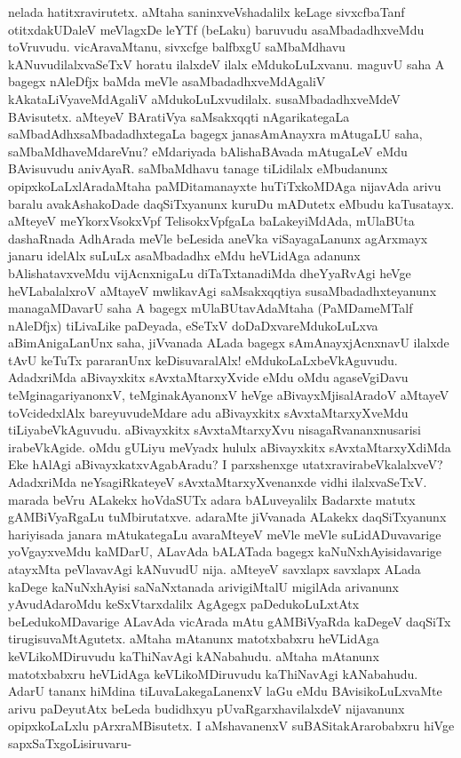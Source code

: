 nelada hatitxravirutetx. aMtaha saninxveVshadalilx keLage sivxcfbaTanf otitxdakUDaleV meVlagxDe leYTf (beLaku) baruvudu asaMbadadhxveMdu toVruvudu. vicAravaMtanu, \hbox{sivxcfge} balfbxgU saMbaMdhavu kANuvudilalxvaSeTxV horatu ilalxdeV ilalx eMdukoLuLxvanu. maguvU saha A bagegx nAleDfjx baMda meVle asaMbadadhxveMdAgaliV kAkataLiVyaveMdAgaliV aMdukoLuLxvudilalx. susaMbadadhxveMdeV BAvisutetx. aMteyeV BAratiVya saMsakxqqti nAgarikategaLa saMbadAdhxsaMbadadhxtegaLa bagegx janasAmAnayxra mAtugaLU saha, saMbaMdhaveMdareVnu? eMdariyada bAlishaBAvada mAtugaLeV eMdu BAvisuvudu anivAyaR. saMbaMdhavu tanage tiLidilalx eMbudanunx opipxkoLaLxlAradaMtaha paMDitamanayxte huTiTxkoMDAga nijavAda arivu baralu avakAshakoDade daqSiTxyanunx kuruDu mADutetx  eMbudu kaTusatayx. aMteyeV meYkorxVsokxVpf TelisokxVpfgaLa baLakeyiMdAda, mUlaBUta dashaRnada AdhArada meVle beLesida aneVka viSayagaLanunx agArxmayx janaru idelAlx suLuLx asaMbadadhx eMdu heVLidAga adanunx bAlishatavxveMdu vijAcnxnigaLu diTaTxtanadiMda dheYyaRvAgi heVge heVLabalalxroV aMtayeV mwlikavAgi saMsakxqqtiya susaMbadadhxteyanunx managaMDavarU saha A bagegx mUlaBUtavAdaMtaha (PaMDameMTalf nAleDfjx) tiLivaLike paDeyada, eSeTxV doDaDxvareMdukoLuLxva aBimAnigaLanUnx saha, jiVvanada ALada bagegx sAmAnayxjAcnxnavU ilalxde tAvU keTuTx pararanUnx keDisuvaralAlx! eMdukoLaLxbeVkAguvudu. AdadxriMda aBivayxkitx sAvxtaMtarxyXvide eMdu oMdu agaseVgiDavu teMginagariyanonxV, teMginakAyanonxV heVge aBivayxMjisalAradoV aMtayeV toVcidedxlAlx bareyuvudeMdare adu aBivayxkitx sAvxtaMtarxyXveMdu tiLiyabeVkAguvudu. aBivayxkitx sAvxtaMtarxyXvu nisagaRvananxnusarisi irabeVkAgide. oMdu gULiyu meVyadx hululx aBivayxkitx sAvxtaMtarxyXdiMda Eke hAlAgi aBivayxkatxvAgabAradu? I parxshenxge utatxravirabeVkalalxveV? AdadxriMda neYsagiRkateyeV sAvxtaMtarxyXvenanxde vidhi ilalxvaSeTxV. marada beVru ALakekx hoVdaSUTx adara bALuveyalilx Badarxte matutx gAMBiVyaRgaLu tuMbirutatxve. adaraMte jiVvanada ALakekx daqSiTxyanunx hariyisada janara mAtukategaLu avaraMteyeV meVle meVle suLidADuvavarige yoVgayxveMdu kaMDarU, ALavAda bALATada bagegx kaNuNxhAyisidavarige atayxMta peVlavavAgi kANuvudU nija. aMteyeV savxlapx savxlapx ALada kaDege kaNuNxhAyisi saNaNxtanada arivigiMtalU migilAda arivanunx yAvudAdaroMdu keSxVtarxdalilx AgAgegx paDedukoLuLxtAtx beLedukoMDavarige ALavAda vicArada mAtu gAMBiVyaRda kaDegeV daqSiTx tirugisuvaMtAgutetx. aMtaha mAtanunx matotxbabxru heVLidAga keVLikoMDiruvudu kaThiNavAgi kANabahudu. aMtaha mAtanunx matotxbabxru heVLidAga keVLikoMDiruvudu kaThiNavAgi kANabahudu. AdarU tananx hiMdina tiLuvaLakegaLanenxV laGu eMdu BAvisikoLuLxvaMte arivu paDeyutAtx beLeda budidhxyu pUvaRgarxhavilalxdeV nijavanunx opipxkoLaLxlu pArxraMBisutetx. I aMshavanenxV suBASitakArarobabxru hiVge sapxSaTxgoLisiruvaru-

